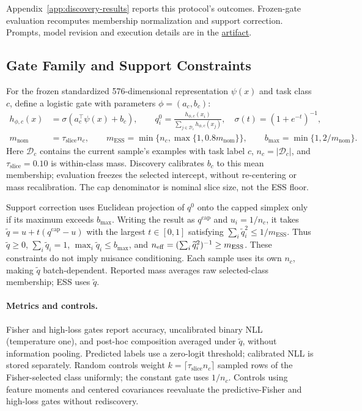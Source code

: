Appendix~\ref{app:discovery-results} reports this protocol's outcomes. Frozen-gate evaluation recomputes membership normalization and support correction. Prompts, model revision and execution details are in the \hyperref[sec:artifact-availability]{artifact}.

\subsection{Gate Family and Support Constraints}
\label{app:gate-support}
For the frozen standardized 576-dimensional representation $\psi(x)$ and task class $c$, define a logistic gate with parameters $\phi=(a_c,b_c)$:
\[
\begin{aligned}
h_{\phi,c}(x)&=\sigma(a_c^\top\psi(x)+b_c),\qquad
q_i^0=\frac{h_{\phi,c}(x_i)}{\sum_{j\in\mathcal D_c}h_{\phi,c}(x_j)},\quad
\sigma(t)=(1+e^{-t})^{-1},\\
m_{\mathrm{nom}}&=\tau_{\mathrm{slice}}n_c,\qquad
m_{\mathrm{ESS}}=\min\{n_c,\max\{1,0.8m_{\mathrm{nom}}\}\},\qquad
b_{\max}=\min\{1,2/m_{\mathrm{nom}}\}.
\end{aligned}
\]
Here $\mathcal D_c$ contains the current sample's examples with task label $c$, $n_c=|\mathcal D_c|$, and $\tau_{\mathrm{slice}}=0.10$ is within-class mass. Discovery calibrates $b_c$ to this mean membership; evaluation freezes the selected intercept, without re-centering or mass recalibration. The cap denominator is nominal slice size, not the ESS floor.

Support correction uses Euclidean projection of $q^0$ onto the capped simplex only if its maximum exceeds $b_{\max}$. Writing the result as $q^{\mathrm{cap}}$ and $u_i=1/n_c$, it takes $\widetilde q=u+t(q^{\mathrm{cap}}-u)$ with the largest $t\in[0,1]$ satisfying $\sum_i\widetilde q_i^2\le1/m_{\mathrm{ESS}}$. Thus $\widetilde q\ge0$, $\sum_i\widetilde q_i=1$, $\max_i\widetilde q_i\le b_{\max}$, and $n_{\mathrm{eff}}=(\sum_i\widetilde q_i^2)^{-1}\ge m_{\mathrm{ESS}}$. These constraints do not imply nuisance conditioning. Each sample uses its own $n_c$, making $\widetilde q$ batch-dependent. Reported mass averages raw selected-class membership; ESS uses $\widetilde q$.

\paragraph{Metrics and controls.}
\label{app:reported-slice-metrics}
Fisher and high-loss gates report accuracy, uncalibrated binary NLL (temperature one), and post-hoc composition averaged under $\widetilde q$, without information pooling. Predicted labels use a zero-logit threshold; calibrated NLL is stored separately. Random controls weight $k=\lceil\tau_{\mathrm{slice}}n_c\rceil$ sampled rows of the Fisher-selected class uniformly; the constant gate uses $1/n_c$. Controls using feature moments and centered covariances reevaluate the predictive-Fisher and high-loss gates without rediscovery.

